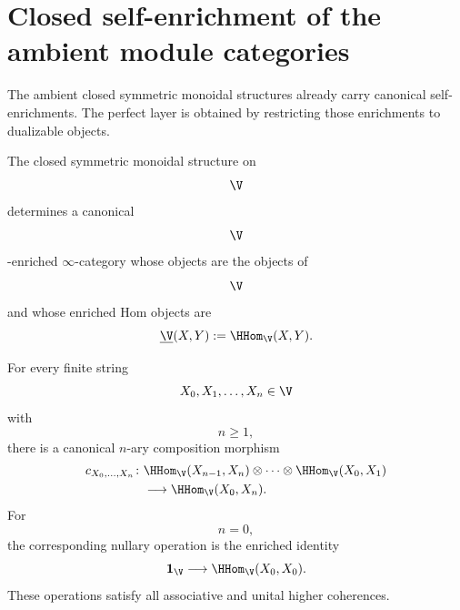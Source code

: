 \section{Closed self-enrichment of the ambient module categories}
\label{sec:closed-self-enrichment-before-perfect-restriction}

The ambient closed symmetric monoidal structures already carry canonical
self-enrichments. The perfect layer is obtained by restricting those
enrichments to dualizable objects.

\begin{proposition}
\label{prop:ambient-self-enrichment}
The closed symmetric monoidal structure on
\[
    \V
\]
determines a canonical
\[
    \V
\]
-enriched $\infty$-category whose objects are the objects of
\[
    \V
\]
and whose enriched Hom objects are
\[
    \underline{\V}(X,Y)
    :=
    \HHom_{\V}(X,Y).
\]

For every finite string
\[
    X_0,X_1,\ldots,X_n
    \in
    \V
\]
with
\[
    n\geq1,
\]
there is a canonical $n$-ary composition morphism
\[
\begin{aligned}
    c_{X_0,\ldots,X_n}
    \colon{}&
    \HHom_{\V}(X_{n-1},X_n)
    \otimes
    \cdots
    \otimes
    \HHom_{\V}(X_0,X_1)
    \\
    &\longrightarrow
    \HHom_{\V}(X_0,X_n).
\end{aligned}
\]
For
\[
    n=0,
\]
the corresponding nullary operation is the enriched identity
\[
    \mathbf 1_{\V}
    \longrightarrow
    \HHom_{\V}(X_0,X_0).
\]
These operations satisfy all associative and unital higher coherences.
\end{proposition}

